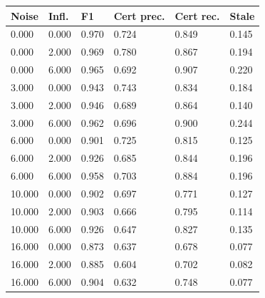 \begin{tabular}{llllll}
\toprule
Noise & Infl. & F1 & Cert prec. & Cert rec. & Stale \\
\midrule
0.000 & 0.000 & 0.970 & 0.724 & 0.849 & 0.145 \\
0.000 & 2.000 & 0.969 & 0.780 & 0.867 & 0.194 \\
0.000 & 6.000 & 0.965 & 0.692 & 0.907 & 0.220 \\
3.000 & 0.000 & 0.943 & 0.743 & 0.834 & 0.184 \\
3.000 & 2.000 & 0.946 & 0.689 & 0.864 & 0.140 \\
3.000 & 6.000 & 0.962 & 0.696 & 0.900 & 0.244 \\
6.000 & 0.000 & 0.901 & 0.725 & 0.815 & 0.125 \\
6.000 & 2.000 & 0.926 & 0.685 & 0.844 & 0.196 \\
6.000 & 6.000 & 0.958 & 0.703 & 0.884 & 0.196 \\
10.000 & 0.000 & 0.902 & 0.697 & 0.771 & 0.127 \\
10.000 & 2.000 & 0.903 & 0.666 & 0.795 & 0.114 \\
10.000 & 6.000 & 0.926 & 0.647 & 0.827 & 0.135 \\
16.000 & 0.000 & 0.873 & 0.637 & 0.678 & 0.077 \\
16.000 & 2.000 & 0.885 & 0.604 & 0.702 & 0.082 \\
16.000 & 6.000 & 0.904 & 0.632 & 0.748 & 0.077 \\
\bottomrule
\end{tabular}
